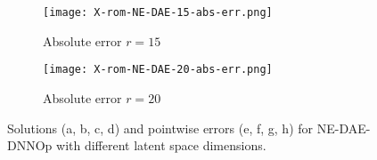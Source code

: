 \begin{figure}[!htb]
\begin{center}
\begin{subfigure}[b]{0.23\textwidth}
        \end{subfigure}   
        \begin{subfigure}[b]{0.23\textwidth}
            \begin{center}
            \texttt{[image: X-rom-NE-DAE-15-abs-err.png]}
            \end{center}
            \caption{Absolute error $r = 15$}
        \end{subfigure}    
        \begin{subfigure}[b]{0.23\textwidth}
            \begin{center}
                \texttt{[image: X-rom-NE-DAE-20-abs-err.png]}
            \end{center}
            \caption{Absolute error $r = 20$}
        \end{subfigure}
     \end{center}
     \caption[Solutions and pointwise errors for NE-DAE-DNNOp.]{Solutions (a, b, c, d) and pointwise errors (e, f, g, h) for NE-DAE-DNNOp with different latent space dimensions.}
        \label{fig: nedae-burger}
\end{figure}